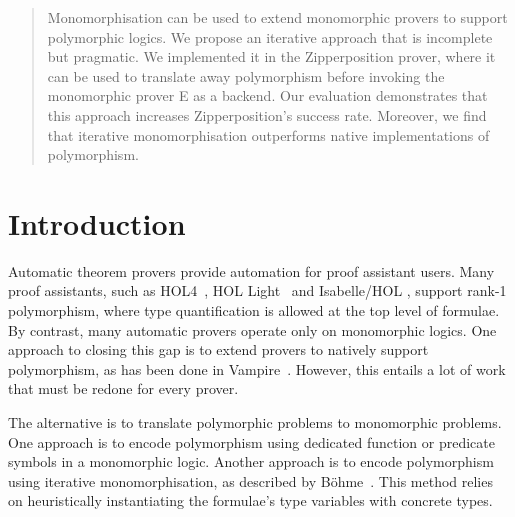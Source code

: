 \documentclass[runningheads]{llncs}
\begin{document}
\author{Tanguy Bozec \and
Jasmin Blanchette}




\maketitle

\begin{sloppy}
\begin{abstract}
Monomorphisation can be used to extend monomorphic provers to support polymorphic logics. We propose an iterative approach that is incomplete but pragmatic. We implemented it in the Zipperposition prover, where it can be used to translate away polymorphism before invoking the monomorphic prover E as a backend. Our evaluation demonstrates that this approach increases Zipperposition's success rate. Moreover, we find that iterative monomorphisation outperforms native implementations of polymorphism.

\end{abstract}
\end{sloppy}

\section{Introduction}

Automatic theorem provers provide automation for proof assistant users. Many proof assistants, such as HOL4~\cite{slind-norrish-2008}, HOL Light~\cite{harrison-2009} and Isabelle\slash HOL \cite{nipkow-et-al-2002}, support rank-1 polymorphism, where type quantification is allowed at the top level of formulae. By contrast, many automatic provers operate only on monomorphic logics. One approach to closing this gap is to extend provers to natively support polymorphism, as has been done in Vampire~\cite{bhayat-reger-2020}. However, this entails a lot of work that must be redone for every prover.

The alternative is to translate polymorphic problems to monomorphic problems.
One approach \cite[Section~9]{mono-trans} is to encode polymorphism using dedicated function or predicate symbols in a monomorphic logic. Another approach is to encode polymorphism using {iterative monomorphisation}, as described by B\"ohme~\cite[Section 2.2.1]{sb-phd}. This method relies on heuristically instantiating the formulae's type variables with concrete types.
\end{document}
